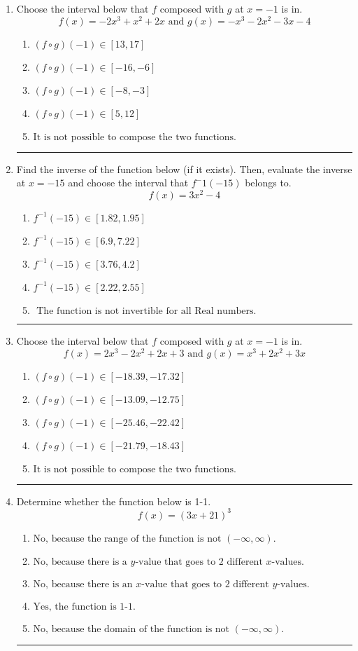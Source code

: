 \documentclass[14pt]{extbook}
\newcommand{\litem}[1]{\item#1\hspace*{-1cm}\rule{\textwidth}{0.4pt}}
\begin{document}
\begin{enumerate}
{\begin{enumerate}[label=\Alph*.]
\end{enumerate} }
\litem{
Choose the interval below that $f$ composed with $g$ at $x=-1$ is in.\[ f(x) = -2x^{3} + x^{2} +2 x \text{ and } g(x) = -x^{3} -2 x^{2} -3 x -4 \]\begin{enumerate}[label=\Alph*.]
\item \( (f \circ g)(-1) \in [13, 17] \)
\item \( (f \circ g)(-1) \in [-16, -6] \)
\item \( (f \circ g)(-1) \in [-8, -3] \)
\item \( (f \circ g)(-1) \in [5, 12] \)
\item \( \text{It is not possible to compose the two functions.} \)

\end{enumerate} }
\litem{
Find the inverse of the function below (if it exists). Then, evaluate the inverse at $x = -15$ and choose the interval that $f^-1(-15)$ belongs to.\[ f(x) = 3 x^2 - 4 \]\begin{enumerate}[label=\Alph*.]
\item \( f^{-1}(-15) \in [1.82, 1.95] \)
\item \( f^{-1}(-15) \in [6.9, 7.22] \)
\item \( f^{-1}(-15) \in [3.76, 4.2] \)
\item \( f^{-1}(-15) \in [2.22, 2.55] \)
\item \( \text{ The function is not invertible for all Real numbers. } \)

\end{enumerate} }
\litem{
Choose the interval below that $f$ composed with $g$ at $x=-1$ is in.\[ f(x) = 2x^{3} -2 x^{2} +2 x + 3 \text{ and } g(x) = x^{3} +2 x^{2} +3 x \]\begin{enumerate}[label=\Alph*.]
\item \( (f \circ g)(-1) \in [-18.39, -17.32] \)
\item \( (f \circ g)(-1) \in [-13.09, -12.75] \)
\item \( (f \circ g)(-1) \in [-25.46, -22.42] \)
\item \( (f \circ g)(-1) \in [-21.79, -18.43] \)
\item \( \text{It is not possible to compose the two functions.} \)

\end{enumerate} }
\litem{
Determine whether the function below is 1-1.\[ f(x) = (3 x + 21)^3 \]\begin{enumerate}[label=\Alph*.]
\item \( \text{No, because the range of the function is not $(-\infty, \infty)$.} \)
\item \( \text{No, because there is a $y$-value that goes to 2 different $x$-values.} \)
\item \( \text{No, because there is an $x$-value that goes to 2 different $y$-values.} \)
\item \( \text{Yes, the function is 1-1.} \)
\item \( \text{No, because the domain of the function is not $(-\infty, \infty)$.} \)


\end{enumerate}}
\end{enumerate}
\end{document}
